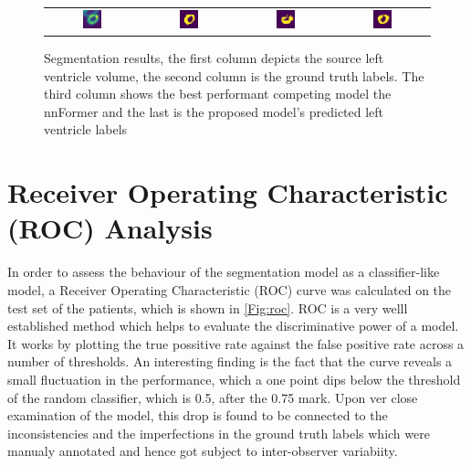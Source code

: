 \begin{figure}[htbp]
{\begin{tabular}{cccc}
        \includegraphics[width=0.22\textwidth]{images/segs/sagittal_input.png} &
        \includegraphics[width=0.22\textwidth]{images/segs/sagittal_gt.png} &
        \includegraphics[width=0.22\textwidth]{images/segs/sagittal_pred.png}&
        \includegraphics[width=0.22\textwidth]{images/segs/sagittal_pred_SP.png} \\
    \end{tabular}
    }
    \caption{Segmentation results, the first column depicts the source left ventricle volume, the second column is the ground truth labels. The third column shows the best performant competing model the nnFormer and the last is the proposed model's predicted left ventricle labels}
    \label{Fig:preds}
\end{figure}
    


\section{Receiver Operating Characteristic (ROC) Analysis}
In order to assess the behaviour of the segmentation model as a classifier-like model, a Receiver Operating Characteristic (ROC) curve was calculated on the test set of the patients, which is shown in \cref{Fig:roc}. ROC is a very welll established method which helps to evaluate the discriminative power of a model. It works by plotting the true possitive rate against the false positive rate across a number of thresholds. An interesting finding is the fact that the curve reveals a small fluctuation in the performance, which a one point dips below the threshold of the random classifier, which is 0.5, after the 0.75 mark. Upon ver close examination of the model, this drop is found to be connected to the  inconsistencies and the imperfections in the ground truth labels which were manualy annotated and hence got subject to inter-observer variabiity.

